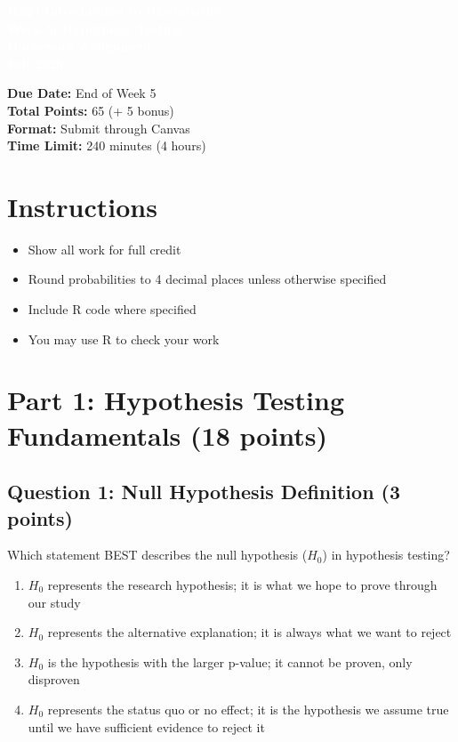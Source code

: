 \documentclass[11pt]{article}
\title{}
\author{}
\date{}
\begin{document}
\begin{tcolorbox}[colback=osaorange,colframe=black,boxrule=2pt,arc=0pt,left=3pt,right=3pt,top=6pt,bottom=6pt,boxsep=2pt]
\centering
\textcolor{white}{\textbf{\Large H524 Introduction to Biostatistics}}\\
\textcolor{white}{\textbf{\Large Week 5: Hypothesis Testing}}\\
\textcolor{white}{\textbf{\Large Homework Assignment}}\\
\textcolor{white}{\textbf{\Large Fall 2025}}
\end{tcolorbox}

\vspace{8pt}

\noindent\textbf{Due Date:} End of Week 5\\
\textbf{Total Points:} 65 (+ 5 bonus)\\
\textbf{Format:} Submit through Canvas\\
\textbf{Time Limit:} 240 minutes (4 hours)

\section*{Instructions}

\begin{itemize}
\item Show all work for full credit
\item Round probabilities to 4 decimal places unless otherwise specified
\item Include R code where specified
\item You may use R to check your work
\end{itemize}

\section{Part 1: Hypothesis Testing Fundamentals (18 points)}

\subsection*{Question 1: Null Hypothesis Definition (3 points)}

Which statement BEST describes the null hypothesis ($H_0$) in hypothesis testing?

\begin{enumerate}[label=\Alph*)]
\item $H_0$ represents the research hypothesis; it is what we hope to prove through our study
\item $H_0$ represents the alternative explanation; it is always what we want to reject
\item $H_0$ is the hypothesis with the larger p-value; it cannot be proven, only disproven
\item $H_0$ represents the status quo or no effect; it is the hypothesis we assume true until we have sufficient evidence to reject it
\end{enumerate}
\end{document}
